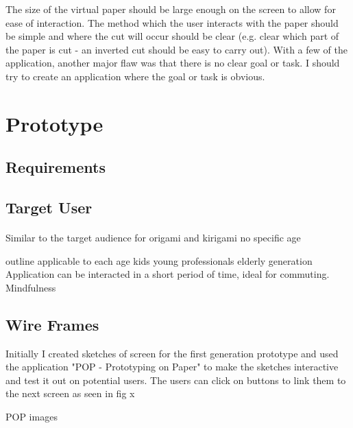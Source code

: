 \documentclass[11pt]{article}
\begin{document}
            The size of the virtual paper should be large enough on the screen to allow for ease of interaction. The method which the user interacts with the paper should be simple and where the cut will occur should be clear (e.g. clear which part of the paper is cut - an inverted cut should be easy to carry out). 
            With a few of the application, another major flaw was that there is no clear goal or task. I should try to create an application where the goal or task is obvious.


\newpage
\section{Prototype}

    \subsection{Requirements}

        \paragraph{}

    \subsection{Target User}
    
            \paragraph{}
            Similar to the target audience for origami and kirigami
            no specific age
            
            outline applicable to each age
            kids
            young professionals 
            elderly generation 
            Application can be interacted in a short period of time, ideal for commuting. Mindfulness 
            

    \subsection{Wire Frames}
    Initially I created sketches of screen for the first generation prototype and used the application "POP - Prototyping on Paper" to make the sketches interactive and test it out on potential users. The users can click on buttons to link them  to the next screen as seen in fig x %
    
        POP images
\end{document}
